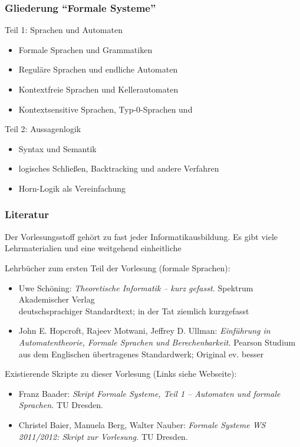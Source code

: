 \documentclass[onlymath]{beamer}
\begin{document}
\begin{frame}\frametitle{Gliederung "`Formale Systeme"'}

\alert{Teil 1: Sprachen und Automaten}
\begin{itemize}
\item Formale Sprachen und Grammatiken
\item Reguläre Sprachen und endliche Automaten
\item Kontextfreie Sprachen und Kellerautomaten
\item Kontextsensitive Sprachen, Typ-0-Sprachen und 
\end{itemize}
\bigskip

\alert{Teil 2: Aussagenlogik}
\begin{itemize}
\item Syntax und Semantik
\item logisches Schließen, Backtracking und andere Verfahren
\item Horn-Logik als Vereinfachung
\end{itemize}

\end{frame}


\begin{frame}\frametitle{Literatur}

Der Vorlesungsstoff gehört zu fast jeder Informatikausbildung. Es gibt viele
Lehrmaterialien und eine weitgehend einheitliche 
\bigskip

Lehrbücher zum ersten Teil der Vorlesung (formale Sprachen):

\begin{itemize}
\item Uwe Schöning: \emph{Theoretische Informatik -- kurz gefasst.} Spektrum Akademischer Verlag\\
{\footnotesize\textcolor{devilscss}{deutschsprachiger Standardtext; in der Tat ziemlich kurzgefasst}}
\item John E. Hopcroft, Rajeev Motwani, Jeffrey D. Ullman: \emph{Einführung in Automatentheorie, Formale Sprachen und Berechenbarkeit.} Pearson Studium\\
{\footnotesize\textcolor{devilscss}{aus dem Englischen übertragenes Standardwerk; Original ev. besser}}
\end{itemize}
Existierende Skripte zu dieser Vorlesung (Links siehe Webseite):
\begin{itemize}
\item Franz Baader: \emph{Skript Formale Systeme, Teil 1 -- Automaten und formale Sprachen.} TU Dresden.
\item Christel Baier, Manuela Berg, Walter Nauber: \emph{Formale Systeme WS 2011/2012: Skript zur Vorlesung.} TU Dresden.
\end{itemize}

\end{frame}
\end{document}
